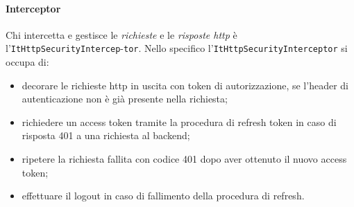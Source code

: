 \paragraph{Interceptor} Chi intercetta e gestisce le \textit{richieste} e le \textit{risposte http} è l'\verb|ItHttpSecurityIntercep|-\verb|tor|.
Nello specifico l'\verb|ItHttpSecurityInterceptor| si occupa di: 
\begin{itemize}
    \item decorare le richieste http in uscita con token di autorizzazione, se l'header di autenticazione non è già presente nella richiesta;
    \item richiedere un access token tramite la procedura di refresh token in caso di risposta 401 a una richiesta al backend;
    \item ripetere la richiesta fallita con codice 401 dopo aver ottenuto il nuovo access token;
    \item effettuare il logout in caso di fallimento della procedura di refresh.
\end{itemize}